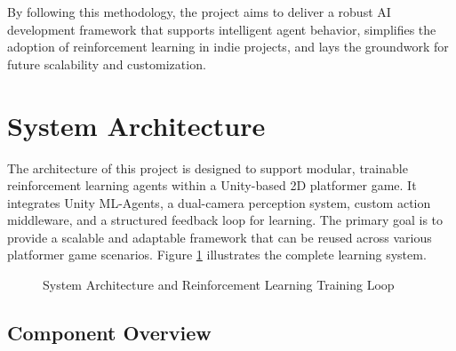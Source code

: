 \documentclass[12pt,oneside,openright,a4paper]{cpe-english-project}
\begin{document}
By following this methodology, the project aims to deliver a robust AI development framework that supports intelligent agent behavior, simplifies the adoption of reinforcement learning in indie projects, and lays the groundwork for future scalability and customization.

\section{System Architecture}

The architecture of this project is designed to support modular, trainable reinforcement learning agents within a Unity-based 2D platformer game. It integrates Unity ML-Agents, a dual-camera perception system, custom action middleware, and a structured feedback loop for learning. The primary goal is to provide a scalable and adaptable framework that can be reused across various platformer game scenarios. Figure \ref{fig:TrainingArchitecture} illustrates the complete learning system.

\begin{figure}[H]
\centering
{}
\caption{System Architecture and Reinforcement Learning Training Loop}\label{fig:TrainingArchitecture}
\end{figure}

\subsection{Component Overview}
\end{document}
